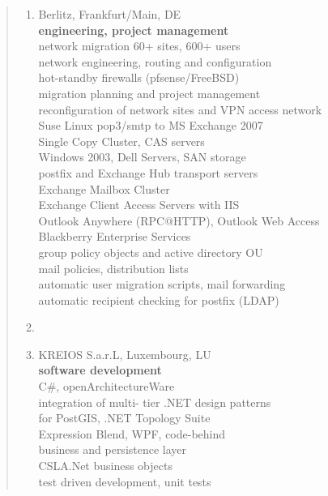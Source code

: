\documentclass[a4paper]{report}
\begin{document}
\begin{quote}
\begin{enumerate}
\item[2007 - 2008]  Berlitz, Frankfurt/Main, DE\\
                    \textbf{engineering, project management}\\
                    network migration 60+ sites, 600+ users\\
                    network engineering, routing and configuration\\
                    hot-standby firewalls (pfsense/FreeBSD)\\
                    migration planning and project management\\
                    reconfiguration of network sites and VPN access network\\
                    Suse Linux pop3/smtp to MS Exchange 2007\\
                    Single Copy Cluster, CAS servers\\
                    Windows 2003, Dell Servers, SAN storage\\
                    postfix and Exchange Hub transport servers\\
                    Exchange Mailbox Cluster\\
                    Exchange Client Access Servers with IIS\\
                    Outlook Anywhere (RPC@HTTP), Outlook Web Access\\
                    Blackberry Enterprise Services\\
                    group policy objects and active directory OU\\
                    mail policies, distribution lists\\
                    automatic user migration scripts, mail forwarding\\
                    automatic recipient checking for postfix (LDAP)

\item[ ]

\item[2007]         KREIOS S.a.r.L, Luxembourg, LU\\
                    \textbf{software development}\\
                    C\#, openArchitectureWare\\
                    integration of multi- tier .NET design patterns\\
                    for PostGIS, .NET Topology Suite\\
                    Expression Blend, WPF, code-behind\\
                    business and persistence layer\\
                    CSLA.Net business objects\\
                    test driven development, unit tests


\end{enumerate}
\end{quote}
\end{document}
